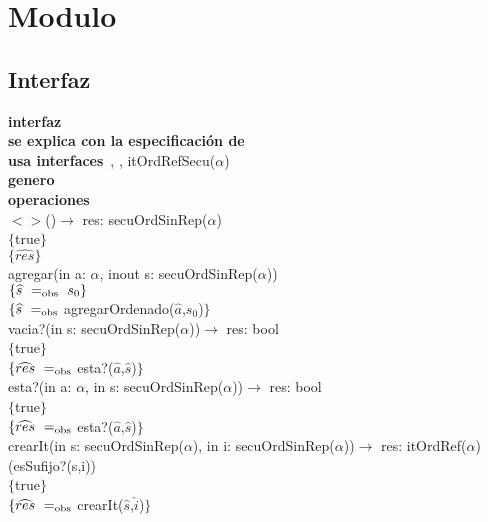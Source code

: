 \section*{Modulo }

\hspace{-0.75cm}
\subsection*{Interfaz}
\textbf{interfaz}\ \\
\textbf{se explica con la especificaci\'on de}\ \\
\textbf{usa interfaces}\ , \nombretad{$\alpha$}, itOrdRefSecu($\alpha$)\\
\textbf{genero}\ \\
\textbf{operaciones}\\

$<>$()$\longrightarrow$ res: secuOrdSinRep($\alpha$)\\
$\{$true$\}$\\
$\{\widehat{res}\}$\\

agregar(in a: $\alpha$, inout s: secuOrdSinRep($\alpha$))\\
$\{\widehat{s}\ =_{\mathrm{obs}}\ s_0\}$\\
$\{\widehat{s}\ =_{\mathrm{obs}}$ agregarOrdenado($\widehat{a}$,$s_0$)$\}$\\

vacia?(in s: secuOrdSinRep($\alpha$))$\longrightarrow$ res: bool\\
$\{$true$\}$\\
$\{\widehat{res}\ =_{\mathrm{obs}}$ esta?($\widehat{a}$,$\widehat{s}$)$\}$\\

esta?(in a: $\alpha$, in s: secuOrdSinRep($\alpha$))$\longrightarrow$ res: bool\\
$\{$true$\}$\\
$\{\widehat{res}\ =_{\mathrm{obs}}$ esta?($\widehat{a}$,$\widehat{s}$)$\}$\\

crearIt(in s: secuOrdSinRep($\alpha$), in i: secuOrdSinRep($\alpha$))$\longrightarrow$ res: itOrdRef($\alpha$)   (esSufijo?(s,i))\\
$\{$true$\}$\\
$\{\widehat{res}\ =_{\mathrm{obs}}$ crearIt($\widehat{s}$,$\widehat{i}$)$\}$\\

